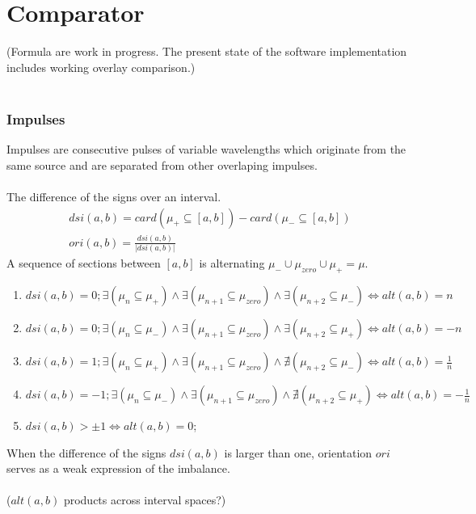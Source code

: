 \documentclass{report}
\begin{document}
\chapter{Comparator}
(Formula are work in progress. The present state of the software implementation includes working overlay comparison.)\\\\
\subsection{Impulses}
Impulses are consecutive pulses of variable wavelengths which originate from the same source and are separated from other overlaping impulses.\\\\
The difference of the signs over an interval.
\begin{align}
dsi(a,b) = card(\mu_{+}\subseteq [a,b])-card(\mu_{-} \subseteq [a,b])\\
ori(a,b) = \frac{dsi(a,b)}{\lvert dsi(a,b) \rvert}
\end{align}
A sequence of sections between $[a,b]$ is alternating $\mu_{-}\cup \mu_{zero}\cup\mu_{+}=\mu$.
\begin{enumerate}
\item $dsi(a,b)= 0; \exists(\mu_{n}\subseteq \mu_{+}) \land \exists(\mu_{n+1}\subseteq \mu_{zero}) \land \exists(\mu_{n+2}\subseteq \mu_{-}) \Leftrightarrow alt(a,b)=n$
\item $dsi(a,b)= 0; \exists(\mu_{n}\subseteq \mu_{-}) \land \exists(\mu_{n+1}\subseteq \mu_{zero}) \land \exists(\mu_{n+2}\subseteq \mu_{+}) \Leftrightarrow alt(a,b)=-n$
\item $dsi(a,b)= 1; \exists(\mu_{n}\subseteq \mu_{+}) \land \exists(\mu_{n+1}\subseteq \mu_{zero}) \land \nexists(\mu_{n+2}\subseteq \mu_{-}) \Leftrightarrow alt(a,b)=\frac{1}{n}$
\item $dsi(a,b)= -1; \exists(\mu_{n}\subseteq \mu_{-}) \land \exists(\mu_{n+1}\subseteq \mu_{zero}) \land \nexists(\mu_{n+2}\subseteq \mu_{+}) \Leftrightarrow alt(a,b)=-\frac{1}{n}$
\item $dsi(a,b)> \pm 1\Leftrightarrow alt(a,b)=0$;
\end{enumerate}
When the difference of the signs $dsi(a,b)$ is larger than one, orientation $ori$ serves as a weak expression of the imbalance.\\\\
($alt(a,b)$ products across interval spaces?)\\\\
\end{document}
